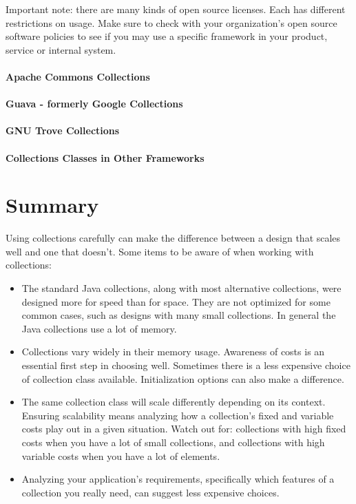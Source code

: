 Important note: there are many kinds of open source licenses. Each has different
restrictions on usage. Make sure to check with your organization's open
source software policies to see if you may use a specific framework in 
your product, service or internal system.

\paragraph{Apache Commons Collections}

\paragraph{Guava - formerly Google Collections}

\paragraph{GNU Trove Collections}

\paragraph{Collections Classes in Other Frameworks}

\section{Summary}
Using collections carefully can
make the difference between a design that scales well and one that
doesn't. Some items to be aware of when working with collections:
\begin{itemize}
  \item The standard Java collections, along with most alternative
  collections, were designed more for speed than for space. They are
  not optimized for some common cases, such as designs with many small
  collections. In general the Java collections use a lot of memory.
  \item Collections vary widely in their memory usage. Awareness of
  costs is an essential first step in choosing well. Sometimes there is a less
  expensive choice of collection class available. Initialization options
  can also make a difference.
  \item The same collection class will scale differently depending on its
  context. Ensuring scalability means
  analyzing how a collection's fixed and variable costs
  play out in a given situation. Watch out for: collections with
  high fixed costs when you have a lot of small collections, and 
  collections with high variable costs when you have a
  lot of elements.
  \item Analyzing your application's requirements, specifically
  which features of a collection you really need, can suggest
  less expensive choices.
\end{itemize}
